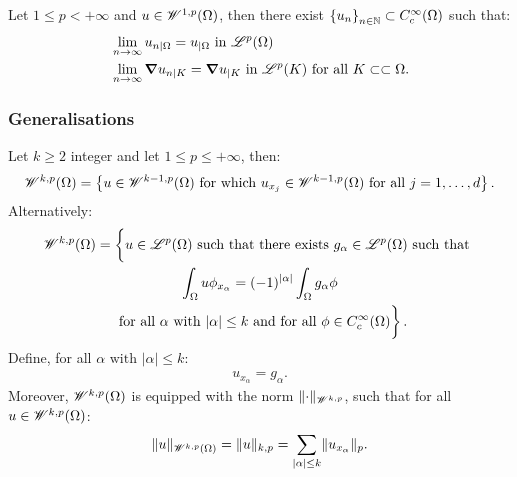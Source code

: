 \begin{theorem}
    Let $1 \leq p < +\infty$ and $u \in \mathscr{W}^{1, p}(\Omega)$, then there exist $\left\{ u_n \right\}_{n \in \mathbb{N}} \subset C_c^{\infty}(\Omega)$ such that:
    \begin{align}
        & \lim_{n \rightarrow \infty} u_{n \mid \Omega} = u_{\mid \Omega} \text { in } \mathscr{L}^{p}(\Omega)\\
        & \lim_{n \rightarrow \infty} \bm{\nabla} u_{n \mid K} = \bm{\nabla} u_{\mid K} \text { in } \mathscr{L}^{p}(K) \text{ for all } K \subset \subset \Omega.
    \end{align}
\end{theorem}

\subsubsection{Generalisations}

\begin{definition}
    Let $k \geq 2$ integer and let $1 \leq p \leq +\infty$, then:
    \begin{gather}
        \mathscr{W}^{k, p}(\Omega) = \left\{ u \in \mathscr{W}^{k - 1, p}(\Omega) \text{ for which } u_{x_j} \in \mathscr{W}^{k - 1, p}(\Omega) \text{ for all } j = 1, \dots, d \right\}.
    \end{gather}
    Alternatively:
    \begin{gather}
        \Wkp{k}{p}(\Omega) = \left\{ \vphantom{\int_{\Omega}} u \in \Lp{p}(\Omega) \text{ such that there exists } g_{\alpha} \in \Lp{p}(\Omega) \text{ such that } \right. \notag \\ 
        \left. \int_{\Omega} u \phi_{x_{\alpha}} = (-1)^{\lvert \alpha \rvert} \int_{\Omega} g_{\alpha} \phi \right. \notag \\
        \left. \text{ for all } \alpha \text{ with } \lvert \alpha \rvert \leq k \text{ and for all }\phi \in C_c^{\infty}(\Omega) \vphantom{\int_{\Omega}} \right\}.
    \end{gather}
    Define, for all $\alpha \text{ with } \lvert \alpha \rvert \leq k$:
    \begin{gather}
        u_{x_{\alpha}} = g_{\alpha}.
    \end{gather}
    Moreover, $\mathscr{W}^{k, p}(\Omega)$ is equipped with the norm $\lVert \cdot \rVert_{\mathscr{W}^{k, p}}$, such that for all $u \in \mathscr{W}^{k, p}(\Omega)$:
    \begin{gather}
        \lVert u \rVert_{\mathscr{W}^{k, p}(\Omega)} = \lVert u \rVert_{k, p} = \sum_{\lvert \alpha \rvert \leq k} \lVert u_{x_{\alpha}} \rVert_p.
    \end{gather}
\end{definition}

